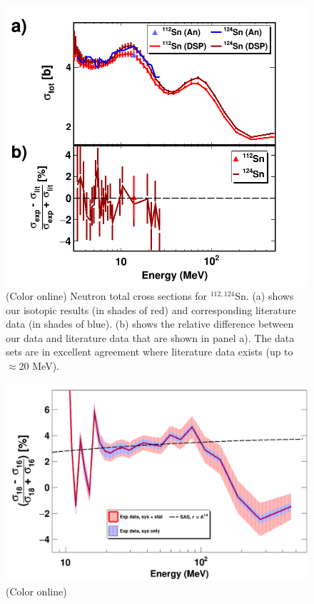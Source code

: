 \documentclass[twocolumn,secnumarabic,amssymb, nobibnotes, aps, prl,
superscriptaddress, nobalancelastpage]{revtex4}
\begin{document}
\begin{figure}
    \includegraphics[scale=0.35]{figures/TwoPanelSn.png}
    \caption{(Color online) Neutron total cross sections for $^{112,124}$Sn.
        (a) shows our isotopic results (in shades of red) and
        corresponding literature data \cite{Harper1982, Rapaport1980, Dukarevich1967} (in
        shades of blue). (b) shows the relative difference between our data
        and literature data that are shown in panel a). The data sets are in
    excellent agreement where literature data exists (up to $\approx$20 MeV).}
    \label{TwoPanelSn}
\end{figure}

\begin{figure}
    \includegraphics[scale=0.35]{figures/relativeDiff_O18O16.png}
    \caption{(Color online) 
    }
    \label{IsotopicDifferenceO}
\end{figure}
\end{document}
